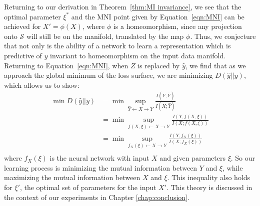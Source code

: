 Returning to our derivation in Theorem~\ref{thm:MI invariance}, we see that the optimal parameter $\xi^*$ and the MNI point given by Equation~\ref{eqn:MNI} can be achieved for $X' = \phi(X)$, where $\phi$ is a homeomorphism, since any projection onto $\mathcal{S}$ will still be on the manifold, translated by the map $\phi$.
Thus, we conjecture that not only is the ability of a network to learn a representation which is predictive of $y$ invariant to homeomorphism on the input data manifold.
Returning to Equation~\ref{eqn:MNI}, when $Z$ is replaced by $\hat{y}$, we find that as we approach the global minimum of the loss surface, we are minimizing $D(\hat{y}||y)$, which allows us to show:
\begin{align} \label{eqn:2.19}
\min D(\hat{y}||y) & = \min \sup_{\hat{Y} \leftarrow X \rightarrow Y}\frac{I(Y; \hat{Y})}{I(X; \hat{Y})} \\
& = \min \sup_{f(X, \xi) \leftarrow X \rightarrow Y} \frac{I(Y; f(X, \xi))}{I(X; f(X, \xi))} \\
& = \min \sup_{f_X(\xi) \leftarrow X \rightarrow Y} \frac{I(Y; f_X(\xi))}{I(X; f_X(\xi))} \\
\end{align}
where $f_X(\xi)$ is the neural network with input $X$ and given parameters $\xi$.
So our learning process is minimizing the mutual information between $Y$ and $\xi$, while maximizing the mutual information between $X$ and $\xi$.
This inequality also holds for $\xi'$, the optimal set of parameters for the input $X'$.
This theory is discussed in the context of our experiments in Chapter \ref{chap:conclusion}.